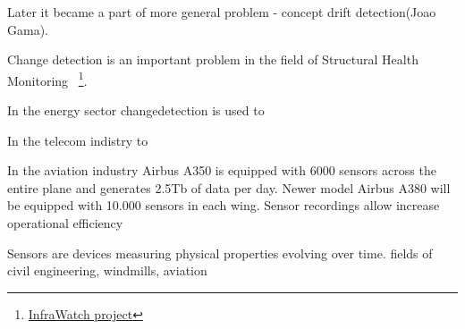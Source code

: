 %
Later it became a part of more general problem - concept drift detection(Joao Gama).

Change detection is an important problem in the field
of Structural Health Monitoring~\cite{MiaoMultiSensor}
\footnote{\href{http://liacs.leidenuniv.nl/~csinfra/}{InfraWatch project}}.

In the energy sector changedetection is used to

In the telecom indistry
to 

%


In the aviation industry Airbus A350 is equipped with 6000 sensors across the
entire plane and generates 2.5Tb of data per day.
Newer model Airbus A380 will be equipped with 10.000 sensors in each wing.  
Sensor recordings allow increase operational efficiency 

Sensors are devices measuring physical properties evolving over time.
fields of civil engineering, windmills, aviation 

